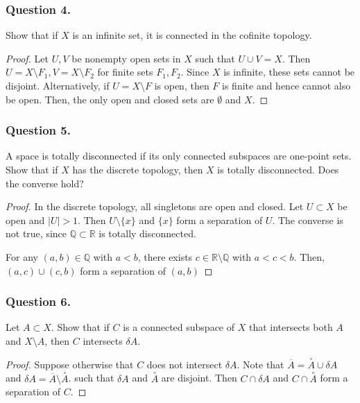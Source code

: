 \documentclass[12pt]{article}
\begin{document}
\subsubsection*{Question 4.} Show that if $X$ is an infinite set, it is connected in the cofinite topology.
\begin{proof}
    Let $U, V$ be nonempty open sets in $X$ such that $U \cup V = X$. Then $U = X \setminus F_1, V = X \setminus F_2$
    for finite sets $F_1, F_2$. Since $X$ is infinite, these sets cannot be disjoint.
    Alternatively, if $U = X \setminus F$ is open, then $F$ is finite and hence cannot also be open. Then, the
    only open and closed sets are $\emptyset$ and $X$.
\end{proof}
\subsubsection*{Question 5.} A space is totally disconnected if its only connected subspaces are one-point sets. 
Show that if $X$ has the discrete topology, then $X$ is totally disconnected. 
Does the converse hold?
\begin{proof}
    In the discrete topology, all singletons are open and closed.
    Let $U \subset X$ be open and $|U| > 1$. Then $U \setminus \{x\}$ and $\{x\}$
    form a separation of $U$. The converse is not true, since $\mathbb{Q} \subset \mathbb{R}$ 
    is totally disconnected.

    For any $(a, b) \in \mathbb{Q}$ with $a < b$, there exists $c \in \mathbb{R} \setminus \mathbb{Q}$ with 
    $a < c < b$. Then, $(a, c) \cup (c, b)$ form a separation of $(a, b)$
\end{proof}
\subsubsection*{Question 6.} Let \( A \subset X \). Show that if \( C \) is a connected 
subspace of \( X \) that intersects both \( A \) and \( X \setminus A \), 
then \( C \) intersects \( \delta A \).
\begin{proof}
    Suppose otherwise that $C$ does not intersect $\delta A$. Note that 
    $\overline{A} = \overset{\circ}{A} \cup \delta A$ and 
    $\delta A = \overline{A} \setminus \overset{\circ}{A}$.
    such that $\delta{A}$ and $\overset{\circ}{A}$ are disjoint.
    Then $C \cap \delta{A}$
    and $C \cap \overset{\circ}{A}$ form a separation of $C$.
\end{proof}
\end{document}
